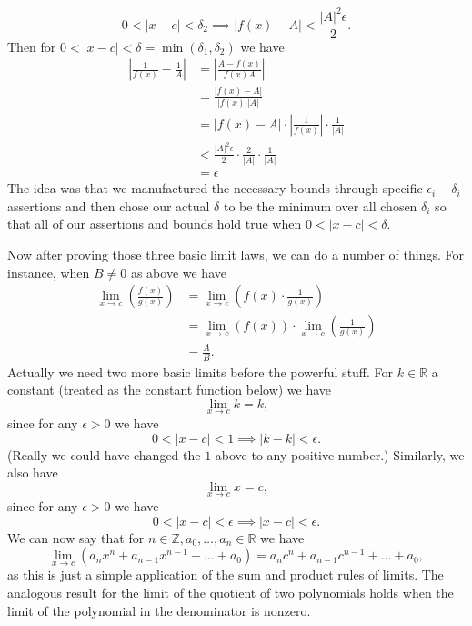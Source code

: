 \documentclass{article}[11pt]
\newcommand{\R}{\mathbb{R}}
\newcommand{\Z}{\mathbb{Z}}
\newcommand{\eps}{\epsilon}
\begin{document}
    $$ 0 < |x - c| < \delta_2 \implies |f(x) - A| < \frac{|A|^2 \eps}{2} .$$
    Then for $0 < |x - c| < \delta = \min(\delta_1, \delta_2)$ we have
    \begin{align*}
        \left| \frac{1}{f(x)} - \frac{1}{A} \right| &= \left| \frac{A - f(x)}{f(x) A} \right| \\
                                                    &= \frac{|f(x) - A|}{|f(x)| |A|} \\
                                                    &= |f(x) - A| \cdot \left| \frac{1}{f(x)} \right| \cdot \frac{1}{|A|} \\
                                                    &< \frac{|A|^2 \eps}{2} \cdot \frac{2}{|A|} \cdot \frac{1}{|A|} \\
                                                    &= \eps
    \end{align*}
    The idea was that we manufactured the necessary bounds through specific $\eps_i-\delta_i$ assertions and then chose our actual $\delta$ to be the minimum over all chosen $\delta_i$ so that all of our assertions and bounds hold true when $0 < |x - c| < \delta$.

    Now after proving those three basic limit laws, we can do a number of things. For instance, when $B \neq 0$ as above we have
    \begin{align*}
        \lim_{x \to c} \left(\frac{f(x)}{g(x)}\right) &= \lim_{x \to c} \left(f(x) \cdot \frac{1}{g(x)}\right) \\
                                         &= \lim_{x \to c} (f(x)) \cdot \lim_{x \to c} \left(\frac{1}{g(x)}\right) \\
                                         &= \frac{A}{B}.
    \end{align*}
    Actually we need two more basic limits before the powerful stuff. For $k \in \R$ a constant (treated as the constant function below) we have
    $$ \lim_{x \to c} k = k ,$$
    since for any $\eps > 0$ we have
    $$ 0 < |x - c| < 1 \implies |k - k| < \eps .$$
    (Really we could have changed the $1$ above to any positive number.) Similarly, we also have
    $$ \lim_{x \to c} x = c ,$$
    since for any $\eps > 0$ we have
    $$ 0 < |x - c| < \eps \implies |x - c| < \eps .$$
    We can now say that for $n \in \Z, a_0, \dots, a_n \in \R$ we have
    $$ \lim_{x \to c} (a_n x^n + a_{n - 1} x^{n - 1} + \dots + a_0) = a_n c^n + a_{n - 1} c^{n - 1} + \dots + a_0 ,$$
    as this is just a simple application of the sum and product rules of limits. The analogous result for the limit of the quotient of two polynomials holds when the limit of the polynomial in the denominator is nonzero.
\end{document}

